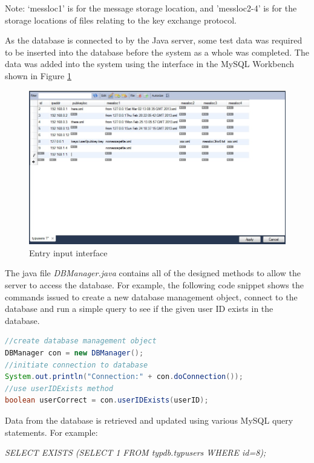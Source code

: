 \documentclass[a4paper,12pt]{report}
\begin{document}
Note: ‘messloc1’ is for the message storage location, and 'messloc2-4' is for the storage locations of files relating to the key exchange protocol. 

As the database is connected to by the Java server, some test data was required to be inserted into the database before the system as a whole was completed. The data was added into the system using the interface in the MySQL Workbench shown in Figure \ref{fig:database2}

\begin{figure}[htb]
 \centering
 \includegraphics[scale=0.5]{images/screenshots/database2.jpg}
 \caption{Entry input interface}
 \label{fig:database2}
\end{figure}

The java file \textit{DBManager.java} contains all of the designed methods to allow the server to access the database. For example, the following code snippet shows the commands issued to create a new database management object, connect to the database and run a simple query to see if the given user ID exists in the database.

\begin{lstlisting}[language=Java]
//create database management object
DBManager con = new DBManager();
//initiate connection to database
System.out.println("Connection:" + con.doConnection());
//use userIDExists method
boolean userCorrect = con.userIDExists(userID);
\end{lstlisting}

Data from the database is retrieved and updated using various MySQL query statements. For example:

\begin{center}
  \textit{SELECT EXISTS (SELECT 1 FROM typdb.typusers WHERE id=8);}
\end{center}
\end{document}
